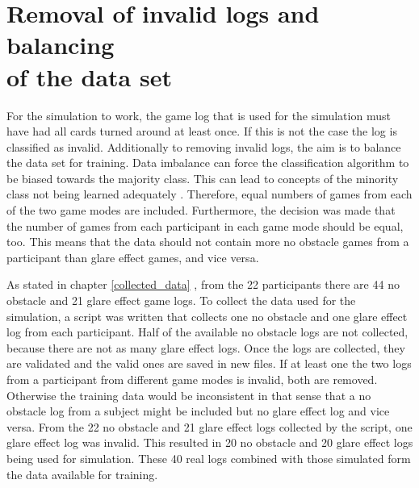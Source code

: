 \section{Removal of invalid logs and balancing \\of the data set}
\label{removal_of_invalid_logs}
For the simulation to work, the game log that is used for the simulation must have had all cards turned around at least once. If this is not the case the log is classified as invalid. Additionally to removing invalid logs, the aim is to balance the data set for training. Data imbalance can force the classification algorithm to be biased towards the majority class. This can lead to concepts of the minority class not being learned adequately \cite[Chapter~1]{imbalance}. Therefore, equal numbers of games from each of the two game modes are included. Furthermore, the decision was made that the number of games from each participant in each game mode should be equal, too. This means that the data should not contain more no obstacle games from a participant than glare effect games, and vice versa.

As stated in chapter \ref{collected_data} , from the 22 participants there are 44 no obstacle and 21 glare effect game logs. To collect the data used for the simulation, a script was written that collects one no obstacle and one glare effect log from each participant. Half of the available no obstacle logs are not collected, because there are not as many glare effect logs. Once the logs are collected, they are validated and the valid ones are saved in new files. If at least one the two logs from a participant from different game modes is invalid, both are removed. Otherwise the training data would be inconsistent in that sense that a no obstacle log from a subject might be included but no glare effect log and vice versa. From the 22 no obstacle and 21 glare effect logs collected by the script, one glare effect log was invalid. This resulted in 20 no obstacle and 20 glare effect logs being used for simulation. These 40 real logs combined with those simulated form the data available for training. 

